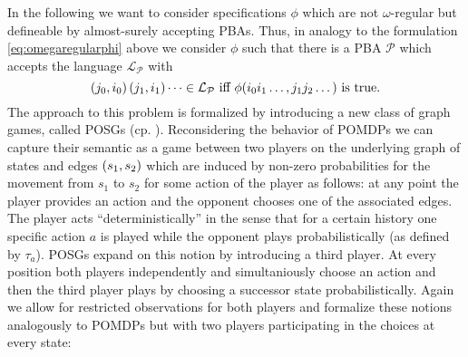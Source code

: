 In the following we want to consider specifications $\phi$ which are not 
$\omega$-regular but defineable by almost-surely accepting \acp{PBA}. Thus, in
analogy to the formulation \ref{eq:omegaregularphi} above we consider $\phi$ 
such that there is a \ac{PBA} $\mathcal{P}$ which accepts the language 
$\mathcal{L}_{\mathcal{P}}$ with
\begin{equation}
  \left(j_{0}, i_{0}\right)\left(j_{1}, i_{1}\right)\dots\in\mathcal{L}_{\mathcal{P}}
  \text{ iff }
  \phi(i_{0}i_{1}\dots, j_{1}j_{2}\dots)\text{ is true.}
\end{equation}
The approach to this problem is formalized by introducing a new class of graph
games, called \acp{POSG} (cp. \cite{POSG, PureStratPOSG}). Reconsidering the 
behavior of \acp{POMDP} we can capture their semantic as a game between two 
players on the underlying graph of states and edges $\left(s_{1}, s_{2}\right)$ 
which are induced by non-zero probabilities for the movement from $s_{1}$ to 
$s_{2}$ for some action of the player as follows: at any point the player 
provides an action and the opponent chooses one of the associated edges. The 
player acts \enquote{deterministically} in the sense that for a certain history 
one specific action $a$ is played while the opponent plays probabilistically 
(as defined by $\tau_{a}$). \acp{POSG} expand on this notion by introducing a 
third player. At every position both players independently and simultaniously 
choose an action and then the third player plays by choosing a successor state 
probabilistically. Again we allow for restricted observations for both players
and formalize these notions analogously to \acp{POMDP} but with two players 
participating in the choices at every state:
